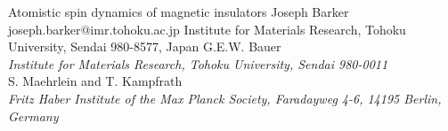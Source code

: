 \begin{conf-abstract}[]
{Atomistic spin dynamics of magnetic insulators}
{\color{blue} Joseph Barker}
{joseph.barker@imr.tohoku.ac.jp}
{Institute for Materials Research, Tohoku University, Sendai 980-8577, Japan}
{{\color{blue}G.E.W. Bauer}\\ \textit{Institute for Materials Research, Tohoku University, Sendai 980-0011}\\ 
{\color{blue}S. Maehrlein and T. Kampfrath}\\ \textit{ Fritz Haber Institute of the Max Planck Society, Faradayweg 4-6, 14195 Berlin, Germany}\\ 
\decofourleft \decofourright}





\printbibliography[heading=none]

\end{conf-abstract}
